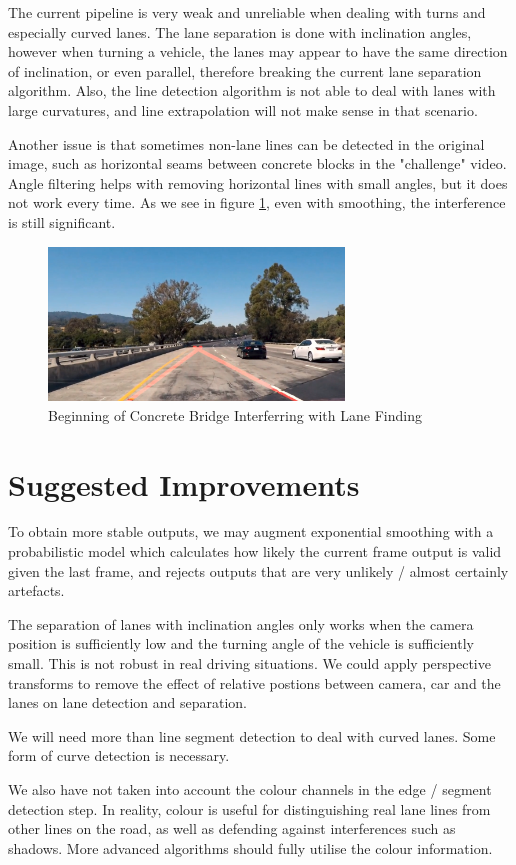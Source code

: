 \documentclass[]{article}
\begin{document}
The current pipeline is very weak and unreliable when dealing with turns and especially curved lanes. The lane separation is done with inclination angles, however when turning a vehicle, the lanes may appear to have the same direction of inclination, or even parallel, therefore breaking the current lane separation algorithm. Also, the line detection algorithm is not able to deal with lanes with large curvatures, and line extrapolation will not make sense in that scenario.

Another issue is that sometimes non-lane lines can be detected in the original image, such as horizontal seams between concrete blocks in the "challenge" video. Angle filtering helps with removing horizontal lines with small angles, but it does not work every time. As we see in figure \ref{fig:intrf}, even with smoothing, the interference is still significant.

\begin{figure}[h]
	\centering
	\includegraphics[width=0.7\textwidth]{issue}
	\caption{Beginning of Concrete Bridge Interferring with Lane Finding}
	\label{fig:intrf}
\end{figure}

\section{Suggested Improvements}

To obtain more stable outputs, we may augment exponential smoothing with a probabilistic model which calculates how likely the current frame output is valid given the last frame, and rejects outputs that are very unlikely / almost certainly artefacts.

The separation of lanes with inclination angles only works when the camera position is sufficiently low and the turning angle of the vehicle is sufficiently small. This is not robust in real driving situations. We could apply perspective transforms to remove the effect of relative postions between camera, car and the lanes on lane detection and separation.

We will need more than line segment detection to deal with curved lanes. Some form of curve detection is necessary.

We also have not taken into account the colour channels in the edge / segment detection step. In reality, colour is useful for distinguishing real lane lines from other lines on the road, as well as defending against interferences such as shadows. More advanced algorithms should fully utilise the colour information.
\end{document}
